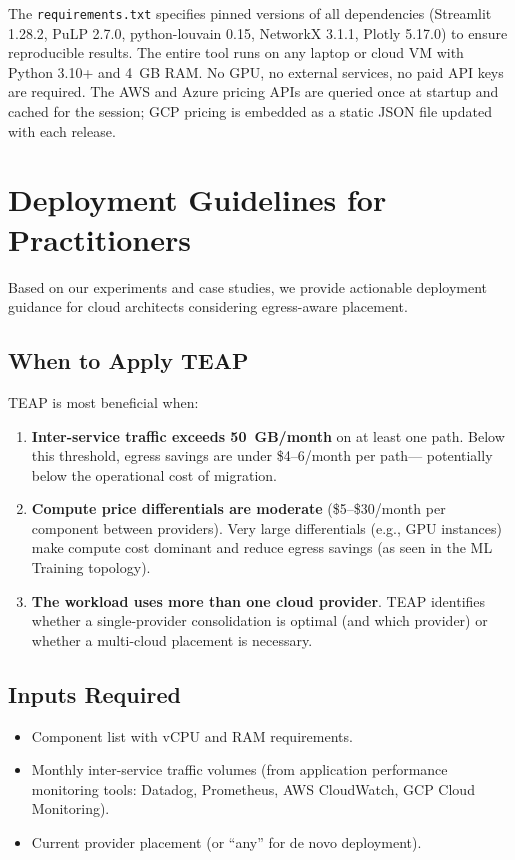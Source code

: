 \documentclass[10pt,journal]{IEEEtran}
\begin{document}
The \texttt{requirements.txt} specifies pinned versions of all dependencies
(Streamlit 1.28.2, PuLP 2.7.0, python-louvain 0.15, NetworkX 3.1.1,
Plotly 5.17.0) to ensure reproducible results.
The entire tool runs on any laptop or cloud VM with Python 3.10+ and 4~GB RAM.
No GPU, no external services, no paid API keys are required.
The AWS and Azure pricing APIs are queried once at startup and cached for the
session; GCP pricing is embedded as a static JSON file updated with each release.


\section{Deployment Guidelines for Practitioners}\label{sec:deploy}

Based on our experiments and case studies, we provide actionable deployment
guidance for cloud architects considering egress-aware placement.

\subsection{When to Apply TEAP}

TEAP is most beneficial when:
\begin{enumerate}[leftmargin=*,noitemsep]
  \item \textbf{Inter-service traffic exceeds 50~GB/month} on at least one path.
    Below this threshold, egress savings are under \$4--6/month per path---
    potentially below the operational cost of migration.
  \item \textbf{Compute price differentials are moderate} (\$5--\$30/month per
    component between providers).
    Very large differentials (e.g., GPU instances) make compute cost dominant
    and reduce egress savings (as seen in the ML Training topology).
  \item \textbf{The workload uses more than one cloud provider}.
    TEAP identifies whether a single-provider consolidation is optimal
    (and which provider) or whether a multi-cloud placement is necessary.
\end{enumerate}

\subsection{Inputs Required}

\begin{itemize}[leftmargin=*,noitemsep]
  \item Component list with vCPU and RAM requirements.
  \item Monthly inter-service traffic volumes (from application performance monitoring
    tools: Datadog, Prometheus, AWS CloudWatch, GCP Cloud Monitoring).
  \item Current provider placement (or ``any'' for de novo deployment).
\end{itemize}
\end{document}
